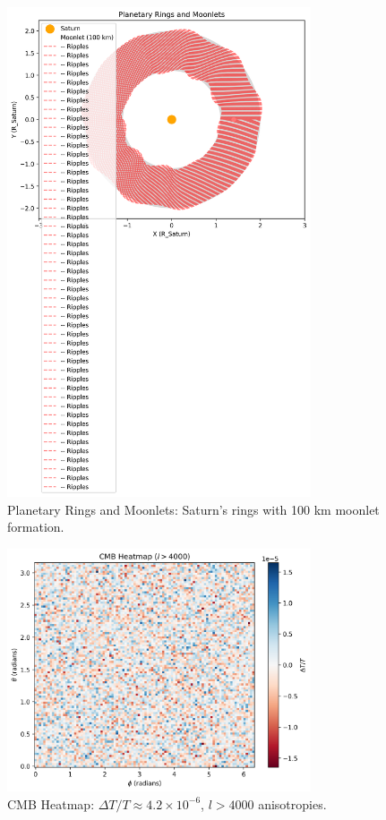 \documentclass[a4paper,12pt]{article}
\begin{document}
\begin{figure}[h]
    \centering
    \includegraphics[width=0.8\textwidth]{figures/planetary_rings.png}
    \caption{Planetary Rings and Moonlets: Saturn's rings with 100 km moonlet formation.}
    \label{fig:planetary_rings}
\end{figure}

\begin{figure}[h]
    \centering
    \includegraphics[width=0.8\textwidth]{figures/cmb_heatmap.png}
    \caption{CMB Heatmap: \(\Delta T / T \approx 4.2 \times 10^{-6}\), \(l > 4000\) anisotropies.}
    \label{fig:cmb_heatmap}
\end{figure}
\end{document}
